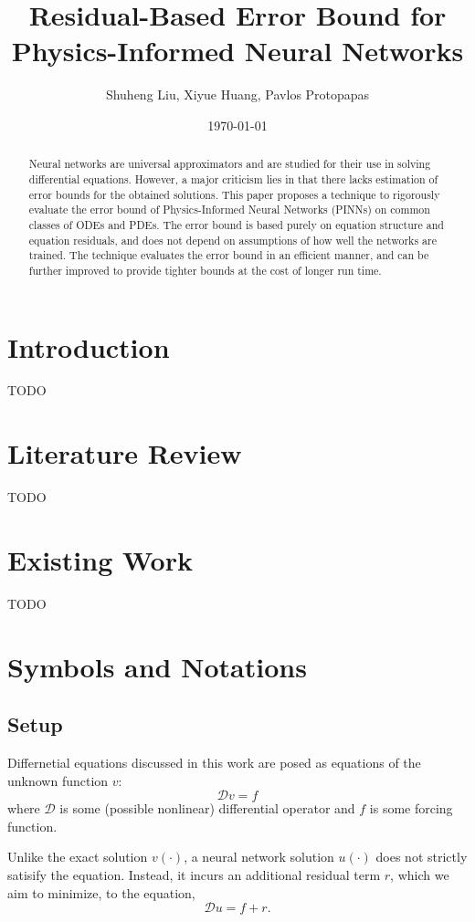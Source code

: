 \documentclass{article}
\title{Residual-Based Error Bound for Physics-Informed Neural Networks}
\author{Shuheng Liu, Xiyue Huang, Pavlos Protopapas}
\date{\today}
\begin{document}
\maketitle

\begin{abstract}
    Neural networks are universal approximators and are studied for their use in solving differential equations.
    However, a major criticism lies in that there lacks estimation of error bounds for the obtained solutions.
    This paper proposes a technique to rigorously evaluate the error bound of Physics-Informed Neural Networks (PINNs) on common classes of ODEs and PDEs.
    The error bound is based purely on equation structure and equation residuals, and does not depend on assumptions of how well the networks are trained.
    The technique evaluates the error bound in an efficient manner, and can be further improved to provide tighter bounds at the cost of longer run time.
\end{abstract}

\section{Introduction}
    TODO

\section{Literature Review}
    TODO

\section{Existing Work}
    TODO
\section{Symbols and Notations}

\subsection{Setup}
    Differnetial equations discussed in this work are posed as equations of the unknown function $v$:
    \begin{equation*}
        \mathcal{D} v = f
    \end{equation*}
    where $\mathcal{D}$ is some (possible nonlinear) differential operator and $f$ is some forcing function.

    Unlike the exact solution $v(\cdot)$, a neural network solution $u(\cdot)$ does not strictly satisify the equation.
    Instead, it incurs an additional residual term $r$, which we aim to minimize, to the equation, 
    \begin{equation*}
        \mathcal{D} u = f + r.
    \end{equation*}
\end{document}
